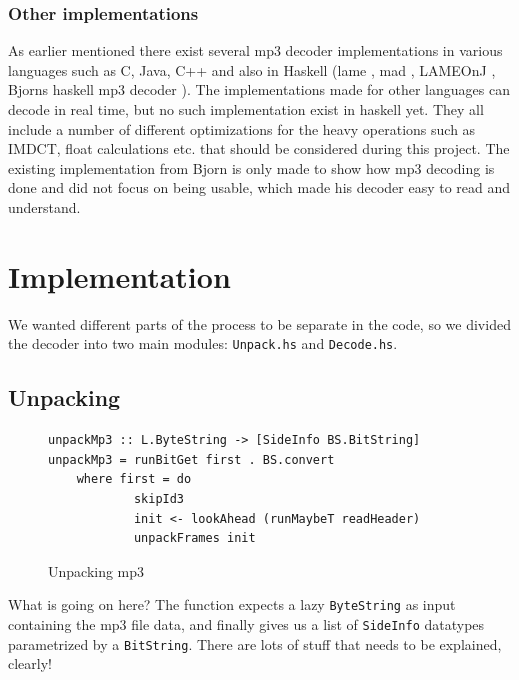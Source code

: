 \documentclass[a4paper,12pt]{article}
\begin{document}
       \subsubsection{Other implementations}
           As earlier mentioned there exist several mp3 decoder
           implementations in various languages such as C, Java, C++
           and also in Haskell (lame \cite{lame}, mad \cite{mad},
           LAMEOnJ \cite{lameonj}, Bjorns haskell mp3
           decoder \cite{bjorn}). The implementations made for other languages can
           decode in real time, but no such implementation exist in
           haskell yet. They all include a number of different
           optimizations for the heavy operations such as IMDCT,
           float calculations etc. that should be considered during
           this project. The existing implementation from Bjorn is
           only made to show how mp3 decoding is done and did not
           focus on being usable, which made his decoder easy to read
           and understand.

\section{Implementation}
    We wanted different parts of the process to be separate in the code, so we
    divided the decoder into two main modules: \texttt{Unpack.hs} and
    \texttt{Decode.hs}.

    \subsection{Unpacking}
\begin{figure}[h]
  \begin{center}
    \begin{lstlisting}
unpackMp3 :: L.ByteString -> [SideInfo BS.BitString]
unpackMp3 = runBitGet first . BS.convert
    where first = do
            skipId3
            init <- lookAhead (runMaybeT readHeader)
            unpackFrames init
    \end{lstlisting}
    \caption{Unpacking mp3}\label{fig:unpacking_mp3}
  \end{center}
\end{figure}

    What is going on here? The function expects a lazy \texttt{ByteString} as
    input containing the mp3 file data, and finally gives us a list of
    \texttt{SideInfo} datatypes parametrized by a \texttt{BitString}. There are
    lots of stuff that needs to be explained, clearly!
\end{document}
